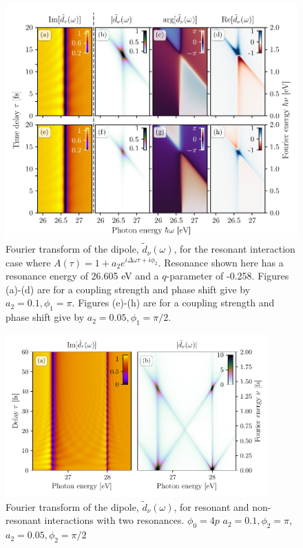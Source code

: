 \begin{figure}
	\centering
	\includegraphics[width=1.0\textwidth]{figures/ATS/DCM_res_high_low.pdf}
	\caption[Fourier transform of the dipole, $\tilde{d}_{\nu}(\omega)$, for the resonant interaction case]{Fourier transform of the dipole, $\tilde{d}_{\nu}(\omega)$, for the resonant interaction case where $A(\tau)=1+a_2e^{i\Delta\omega\tau + i\phi_2}$. Resonance shown here has a resonance energy of 26.605 eV and a $q$-parameter of -0.258.  Figures (a)-(d) are for a coupling strength and phase shift give by $a_2=0.1,\phi_1=\pi$.  Figures (e)-(h) are for a coupling strength and phase shift give by $a_2=0.05,\phi_1=\pi/2$.}
	\label{fig:res_high_low}
\end{figure}

\begin{figure}
	\centering
	\includegraphics[width=0.9\textwidth]{figures/ATS/multiple_resonances.pdf}
	\caption[Fourier transform of the dipole, $\tilde{d}_{\nu}(\omega)$, for resonant and non-resonant interactions with two resonances]{Fourier transform of the dipole, $\tilde{d}_{\nu}(\omega)$, for resonant and non-resonant interactions with two resonances. $\phi_0=4p$ $a_2=0.1,\phi_2=\pi$, $a_2=0.05,\phi_2=\pi/2$}
	\label{fig:multiple_resonances}
\end{figure}

